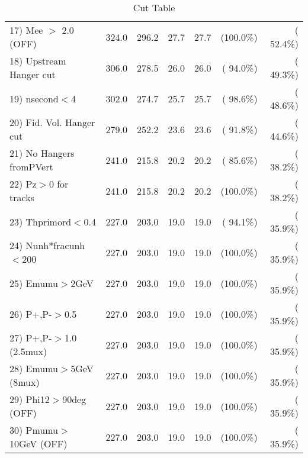 \begin{table}[h!]
\begin{tabular}{||l||r|r|r|r|r|r||}
 17) Mee $>$ 2.0  (OFF)   &        324.0 &        296.2 &         27.7 &         27.7 & (100.0\%) & ( 52.4\%) \\
 18) Upstream Hanger cut  &        306.0 &        278.5 &         26.0 &         26.0 & ( 94.0\%) & ( 49.3\%) \\
 19) nsecond$<$4          &        302.0 &        274.7 &         25.7 &         25.7 & ( 98.6\%) & ( 48.6\%) \\
 20) Fid. Vol. Hanger cut &        279.0 &        252.2 &         23.6 &         23.6 & ( 91.8\%) & ( 44.6\%) \\
 21) No Hangers fromPVert &        241.0 &        215.8 &         20.2 &         20.2 & ( 85.6\%) & ( 38.2\%) \\
 22) Pz$>$0 for tracks    &        241.0 &        215.8 &         20.2 &         20.2 & (100.0\%) & ( 38.2\%) \\
 23) Thprimord$<$0.4      &        227.0 &        203.0 &         19.0 &         19.0 & ( 94.1\%) & ( 35.9\%) \\
 24) Nunh*fracunh$<$200   &        227.0 &        203.0 &         19.0 &         19.0 & (100.0\%) & ( 35.9\%) \\
 25) Emumu$>$2GeV         &        227.0 &        203.0 &         19.0 &         19.0 & (100.0\%) & ( 35.9\%) \\
 26) P+,P-$>$0.5          &        227.0 &        203.0 &         19.0 &         19.0 & (100.0\%) & ( 35.9\%) \\
 27) P+,P-$>$1.0 (2.5mux) &        227.0 &        203.0 &         19.0 &         19.0 & (100.0\%) & ( 35.9\%) \\
 28) Emumu$>$5GeV  (8mux) &        227.0 &        203.0 &         19.0 &         19.0 & (100.0\%) & ( 35.9\%) \\
 29) Phi12$>$90deg  (OFF) &        227.0 &        203.0 &         19.0 &         19.0 & (100.0\%) & ( 35.9\%) \\
 30) Pmumu$>$10GeV  (OFF) &        227.0 &        203.0 &         19.0 &         19.0 & (100.0\%) & ( 35.9\%) \\
 \hline
 \hline
 \end{tabular}
 \caption{Cut Table           }
 \label{tab-cutcohjpsi-mumu_anumucc}
 \end{table}
